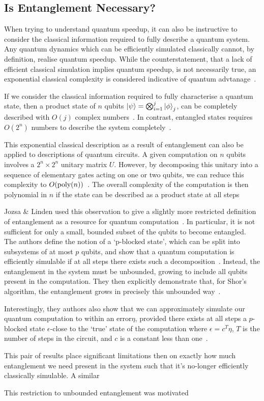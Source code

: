 \documentclass{standalone}
\begin{document}
\subsection{Is Entanglement Necessary?}\label{sec:classicalsim}
When trying to understand quantum speedup, it can also be instructive to consider the classical information required to fully describe a quantum system. Any quantum dynamics which can be efficiently simulated classically cannot, by definition, realise quantum speedup. While the counterstatement, that a lack of efficient classical simulation implies quantum speedup, is not necessarily true, an exponential classical complexity is considered indicative of quantum advtanage~\cite{Jozsa2003}.
\par
If we consider the classical information required to fully characterise a quantum state, then a product state of $n$ qubits $\ket{\psi}=\bigotimes_{i=1}^{j}\ket{\phi}_{j}$, can be completely described with $O(j)$ complex numbers~\cite{Jozsa1997}. In contrast, entangled states requires $O(2^{n})$ numbers to describe the system completely~\cite{Jozsa1997}. 
\par
This exponential classical description as a result of entanglement can also be applied to descriptions of quantum circuits. A given computation on $n$ qubits involves a $2^{n}\times2^{n}$ unitary matrix $U$. However, by decomposing this unitary into a sequence of elementary gates acting on one or two qubits, we can reduce this complexity to $O(\text{poly}(n))$~\cite{Ekert1998}. The overall complexity of the computation is then polynomial in $n$ if the state can be described as a product state at all steps~\cite{Ekert1998} 
\par
Jozsa \& Linden used this observation to give a slightly more restricted definition of entanglement as a resource for quantum computation~\cite{Jozsa2003}. In particular, it is not sufficient for only a small, bounded subset of the qubits to become entangled. The authors define the notion of a `p-blocked state', which can be split into subsystems of at most $p$ qubits, and show that a quantum computation is efficiently simulable if at all steps there exists such a decomposition~\cite{Jozsa2003}. Instead, the entanglement in the system must be unbounded, growing to include all qubits present in the computation. They then explicitly demonstrate that, for Shor's algorithm, the entanglement grows in precisely this unbounded way~\cite{Jozsa2003}.
\par
Interestingly, they authors also show that we can approximately simulate our quantum computation to within an error$\eta$, provided there exists at all steps a $p$-blocked state $\epsilon$-close to the `true' state of the computation where $\epsilon=c^{T}\eta$, $T$ is the number of steps in the circuit, and $c$ is a constant less than one~\cite{Jozsa2003}. 
\par
This pair of results place significant limitations then on exactly how much entanglement we need present in the system such that it's no-longer efficiently classically simulable. A similar
\par
This restriction to unbounded entanglement was motivated 
\end{document}
